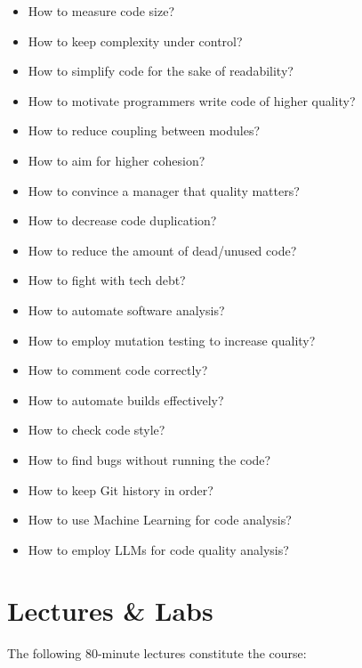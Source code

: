 \documentclass[nobrand,anonymous,nodate,nosecurity]{huawei}
\begin{document}
{\begin{itemize}
\item How to measure code size?
\item How to keep complexity under control?
\item How to simplify code for the sake of readability?
\item How to motivate programmers write code of higher quality?
\item How to reduce coupling between modules?
\item How to aim for higher cohesion?
\item How to convince a manager that quality matters?
\item How to decrease code duplication?
\item How to reduce the amount of dead/unused code?
\item How to fight with tech debt?
\item How to automate software analysis?
\item How to employ mutation testing to increase quality?
\item How to comment code correctly?
\item How to automate builds effectively?
\item How to check code style?
\item How to find bugs without running the code?
\item How to keep Git history in order?
\item How to use Machine Learning for code analysis?
\item How to employ LLMs for code quality analysis?
\end{itemize}

\newpage
\section*{Lectures \& Labs}

The following 80-minute lectures constitute the course:

}
\end{document}
